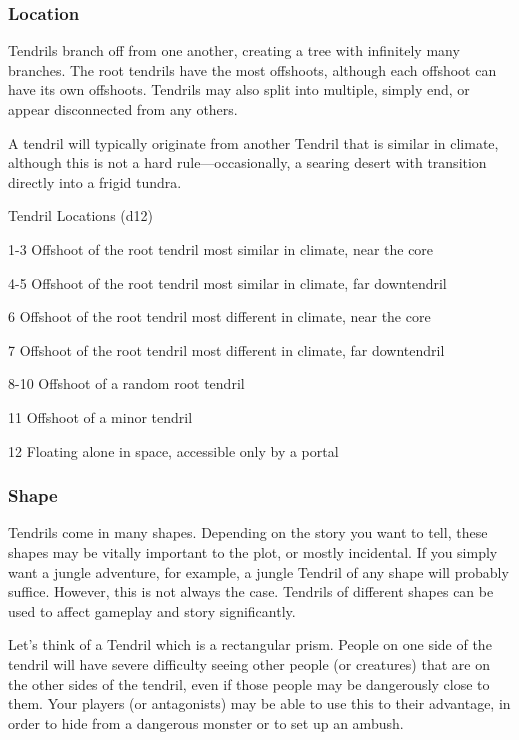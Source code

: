 \begin{multicols*}{2}
\subsubsection{Location}
Tendrils branch off from one another, creating a tree with infinitely many branches.
The root tendrils have the most offshoots, although each offshoot can have its own offshoots.
Tendrils may also split into multiple, simply end, or appear disconnected from any others.

A tendril will typically originate from another Tendril that is similar in climate, although this is not a hard rule---occasionally, a searing desert with transition directly into a frigid tundra.

\begin{rolltable}{Tendril Locations (d12)}
\item[1-3] Offshoot of the root tendril most similar in climate, near the core
\item[4-5] Offshoot of the root tendril most similar in climate, far downtendril
\item[6]  Offshoot of the root tendril most different in climate, near the core
\item[7] Offshoot of the root tendril most different in climate, far downtendril
\item[8-10] Offshoot of a random root tendril 
\item[11] Offshoot of a minor tendril
\item[12] Floating alone in space, accessible only by a portal
\end{rolltable}


\subsubsection{Shape}
Tendrils come in many shapes.
Depending on the story you want to tell, these shapes may be vitally important to the plot, or mostly incidental.
If you simply want a jungle adventure, for example, a jungle Tendril of any shape will probably suffice.
However, this is not always the case.
Tendrils of different shapes can be used to affect gameplay and story significantly.

Let's think of a Tendril which is a rectangular prism.
People on one side of the tendril will have severe difficulty seeing other people (or creatures) that are on the other sides of the tendril, even if those people may be dangerously close to them.
Your players (or antagonists) may be able to use this to their advantage, in order to hide from a dangerous monster or to set up an ambush.



\end{multicols*}
